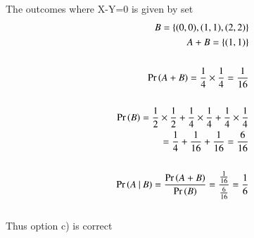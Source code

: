 \documentclass[journal,12pt,twocolumn]{IEEEtran}
\begin{document}
The outcomes where X-Y=0 is given by set
\begin{align}
B=\{(0,0),(1,1),(2,2)\}\\
A+B=\{(1,1)\}\\\notag\\
\Pr\left(A+B\right)=\frac{1}{4}\times\frac{1}{4}=\frac{1}{16}\\\notag\\
\Pr\left(B\right)=\frac{1}{2}\times\frac{1}{2}+\frac{1}{4}\times\frac{1}{4}+\frac{1}{4}\times\frac{1}{4}\notag\\
=\frac{1}{4}+\frac{1}{16}+\frac{1}{16}=\frac{6}{16}\\\notag\\
\Pr\left(A\:|\:B\right)=\frac{\Pr\left(A+B\right)}{\Pr\left(B\right)}=\frac{\frac{1}{16}}{\frac{6}{16}}=\frac{1}{6}
\end{align}
\\Thus option c) is correct\\
\end{document}
